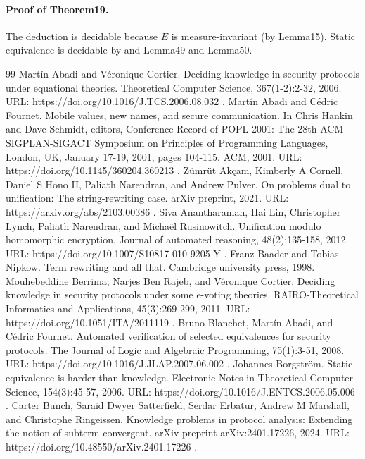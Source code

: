 \documentclass[10pt,a4paper]{amsart}
\begin{document}
\paragraph{Proof of Theorem19.}
The deduction is decidable because $E$ is measure-invariant (by Lemma15). Static equivalence is decidable by and Lemma49 and Lemma50.

\begin{thebibliography}{99}
 Martín Abadi and Véronique Cortier. Deciding knowledge in security protocols under equational theories. Theoretical Computer Science, 367(1-2):2-32, 2006. URL: https://doi.org/10.1016/J.TCS.2006.08.032 .
 Martín Abadi and Cédric Fournet. Mobile values, new names, and secure communication. In Chris Hankin and Dave Schmidt, editors, Conference Record of POPL 2001: The 28th ACM SIGPLAN-SIGACT Symposium on Principles of Programming Languages, London, UK, January 17-19, 2001, pages 104-115. ACM, 2001. URL: https://doi.org/10.1145/360204.360213 .
 Zümrüt Akçam, Kimberly A Cornell, Daniel S Hono II, Paliath Narendran, and Andrew Pulver. On problems dual to unification: The string-rewriting case. arXiv preprint, 2021. URL: https://arxiv.org/abs/2103.00386 .
 Siva Anantharaman, Hai Lin, Christopher Lynch, Paliath Narendran, and Michaël Rusinowitch. Unification modulo homomorphic encryption. Journal of automated reasoning, 48(2):135-158, 2012. URL: https://doi.org/10.1007/S10817-010-9205-Y .
 Franz Baader and Tobias Nipkow. Term rewriting and all that. Cambridge university press, 1998.
 Mouhebeddine Berrima, Narjes Ben Rajeb, and Véronique Cortier. Deciding knowledge in security protocols under some e-voting theories. RAIRO-Theoretical Informatics and Applications, 45(3):269-299, 2011. URL: https://doi.org/10.1051/ITA/2011119 .
 Bruno Blanchet, Martín Abadi, and Cédric Fournet. Automated verification of selected equivalences for security protocols. The Journal of Logic and Algebraic Programming, 75(1):3-51, 2008. URL: https://doi.org/10.1016/J.JLAP.2007.06.002 .
 Johannes Borgström. Static equivalence is harder than knowledge. Electronic Notes in Theoretical Computer Science, 154(3):45-57, 2006. URL: https://doi.org/10.1016/J.ENTCS.2006.05.006 .
 Carter Bunch, Saraid Dwyer Satterfield, Serdar Erbatur, Andrew M Marshall, and Christophe Ringeissen. Knowledge problems in protocol analysis: Extending the notion of subterm convergent. arXiv preprint arXiv:2401.17226, 2024. URL: https://doi.org/10.48550/arXiv.2401.17226 .

\end{thebibliography}
\end{document}
